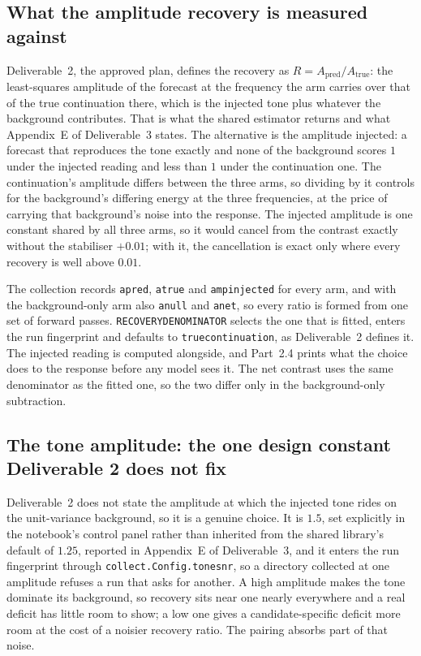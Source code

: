 \documentclass[10pt,a4paper]{article}
\newcommand{\code}[1]{\texttt{\UseBreakableUnderscores #1}}
\newcommand{\UseBreakableUnderscores}{\def\_{\textunderscore\allowbreak}}
\begin{document}
\subsection{What the amplitude recovery is measured against}
Deliverable~2, the approved plan, defines the recovery as $R=A_{\mathrm{pred}}/A_{\mathrm{true}}$: the least-squares amplitude of the forecast at the frequency the arm carries over that of the true continuation there, which is the injected tone plus whatever the background contributes. That is what the shared estimator returns and what Appendix~E of Deliverable~3 states. The alternative is the amplitude injected: a forecast that reproduces the tone exactly and none of the background scores $1$ under the injected reading and less than $1$ under the continuation one. The continuation's amplitude differs between the three arms, so dividing by it controls for the background's differing energy at the three frequencies, at the price of carrying that background's noise into the response. The injected amplitude is one constant shared by all three arms, so it would cancel from the contrast exactly without the stabiliser $+0.01$; with it, the cancellation is exact only where every recovery is well above $0.01$.

The collection records \code{a\_pred}, \code{a\_true} and \code{amp\_injected} for every arm, and with the background-only arm also \code{a\_null} and \code{a\_net}, so every ratio is formed from one set of forward passes. \code{RECOVERY\_DENOMINATOR} selects the one that is fitted, enters the run fingerprint and defaults to \code{true\_continuation}, as Deliverable~2 defines it. The injected reading is computed alongside, and Part~2.4 prints what the choice does to the response before any model sees it. The net contrast uses the same denominator as the fitted one, so the two differ only in the background-only subtraction.

\subsection{The tone amplitude: the one design constant Deliverable 2 does not fix}
Deliverable~2 does not state the amplitude at which the injected tone rides on the unit-variance background, so it is a genuine choice. It is $1.5$, set explicitly in the notebook's control panel rather than inherited from the shared library's default of $1.25$, reported in Appendix~E of Deliverable~3, and it enters the run fingerprint through \code{collect.Config.tone\_snr}, so a directory collected at one amplitude refuses a run that asks for another. A high amplitude makes the tone dominate its background, so recovery sits near one nearly everywhere and a real deficit has little room to show; a low one gives a candidate-specific deficit more room at the cost of a noisier recovery ratio. The pairing absorbs part of that noise.
\end{document}
